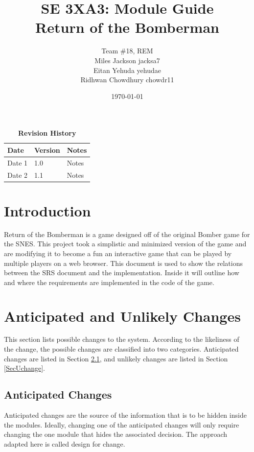 \documentclass[12pt, titlepage]{article}
\title{SE 3XA3: Module Guide\\Return of the Bomberman}
\author{Team \#18, REM
		\\ Miles Jackson  jacksa7
		\\ Eitan Yehuda  yehudae
		\\ Ridhwan Chowdhury chowdr11
}
\date{\today}
\begin{document}
\maketitle

\tableofcontents
\listoftables
\listoffigures

\begin{table}[bp]
\caption{\bf Revision History}
\begin{tabularx}{\textwidth}{p{3cm}p{2cm}X}
\toprule {\bf Date} & {\bf Version} & {\bf Notes}\\
\midrule
Date 1 & 1.0 & Notes\\
Date 2 & 1.1 & Notes\\
\bottomrule
\end{tabularx}
\end{table}

\newpage


\section{Introduction}

Return of the Bomberman is a game designed off of the original Bomber game for the SNES. This project took a simplistic and minimized version of the game and are modifying it to become a fun an interactive game that can be played by multiple players on a web browser. This document is used to show the relations between the SRS document and the implementation. Inside it will outline how and where the requirements are implemented in the code of the game. 

\section{Anticipated and Unlikely Changes} \label{SecChange}

This section lists possible changes to the system. According to the likeliness
of the change, the possible changes are classified into two
categories. Anticipated changes are listed in Section \ref{SecAchange}, and
unlikely changes are listed in Section \ref{SecUchange}.

\subsection{Anticipated Changes} \label{SecAchange}

Anticipated changes are the source of the information that is to be hidden
inside the modules. Ideally, changing one of the anticipated changes will only
require changing the one module that hides the associated decision. The approach
adapted here is called design for
change.
\end{document}
